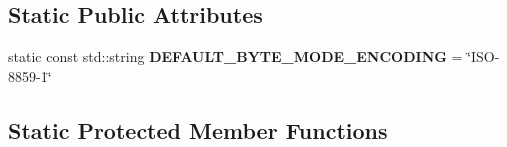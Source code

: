 \subsection*{Static Public Attributes}
\begin{DoxyCompactItemize}
\item 
\mbox{\label{classzxing_1_1qrcode_1_1_encoder_aa23da89acf457013f3c9ea922829ff28}} 
static const std\+::string {\bfseries D\+E\+F\+A\+U\+L\+T\+\_\+\+B\+Y\+T\+E\+\_\+\+M\+O\+D\+E\+\_\+\+E\+N\+C\+O\+D\+I\+NG} = \char`\"{}I\+SO-\/8859-\/1\char`\"{}
\end{DoxyCompactItemize}
\subsection*{Static Protected Member Functions}
